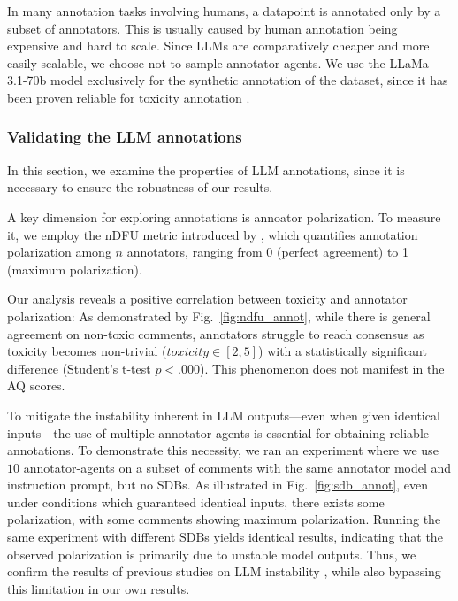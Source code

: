 In many annotation tasks involving humans, a datapoint is annotated only by a subset of annotators. This is usually caused by human annotation being expensive and hard to scale. Since \acp{LLM} are comparatively cheaper and more easily scalable, we choose not to sample annotator-agents. We use the LLaMa-3.1-70b model exclusively for the synthetic annotation of the dataset, since it has been proven reliable for toxicity annotation \cite{koh-etal-2024-llms}. 


\subsubsection{Validating the LLM annotations}

In this section, we examine the properties of \ac{LLM} annotations, since it is necessary to ensure the robustness of our results.

A key dimension for exploring annotations is annoator polarization. To measure it, we employ the \ac{nDFU} metric introduced by \citet{pavlopoulos-likas-2024-polarized}, which quantifies annotation polarization among $n$ annotators, ranging from 0 (perfect agreement) to 1 (maximum polarization). %

Our analysis reveals a positive correlation between toxicity and annotator polarization: As demonstrated by Fig.~\ref{fig:ndfu_annot}, while there is general agreement on non-toxic comments, annotators struggle to reach consensus as toxicity becomes non-trivial ($\textit{toxicity} \in [2,5]$) with a statistically significant difference (Student's t-test $p < .000$). This phenomenon does not manifest in the \ac{AQ} scores. 

To mitigate the instability inherent in \ac{LLM} outputs—even when given identical inputs—the use of multiple annotator-agents is essential for obtaining reliable annotations. To demonstrate this necessity, we ran an experiment where we use $10$ annotator-agents on a subset of comments with the same annotator model and instruction prompt, but no \acp{SDB}. As illustrated in Fig.~\ref{fig:sdb_annot}, even under conditions which guaranteed identical inputs, there exists some polarization, with some comments showing maximum polarization. Running the same experiment with different \acp{SDB} yields identical results, indicating that the observed polarization is primarily due to unstable model outputs. Thus, we confirm the results of previous studies on \ac{LLM} instability \cite{rossi_2024, atil_2025}, while also bypassing this limitation in our own results.


